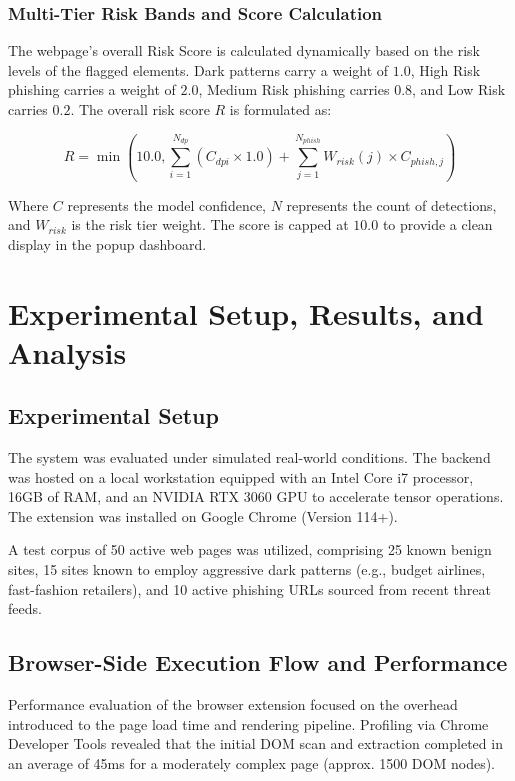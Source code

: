 \documentclass[12pt,a4paper]{report}
\begin{document}
\subsection{Multi-Tier Risk Bands and Score Calculation}
The webpage's overall Risk Score is calculated dynamically based on the risk levels of the flagged elements. Dark patterns carry a weight of $1.0$, High Risk phishing carries a weight of $2.0$, Medium Risk phishing carries $0.8$, and Low Risk carries $0.2$. The overall risk score $R$ is formulated as:

\begin{equation}
R = \min\left(10.0, \sum_{i=1}^{N_{dp}} (C_{dpi} \times 1.0) + \sum_{j=1}^{N_{phish}} W_{risk}(j) \times C_{phish,j} \right)
\end{equation}

Where $C$ represents the model confidence, $N$ represents the count of detections, and $W_{risk}$ is the risk tier weight. The score is capped at $10.0$ to provide a clean display in the popup dashboard.

\chapter{Experimental Setup, Results, and Analysis}

\section{Experimental Setup}
The system was evaluated under simulated real-world conditions. The backend was hosted on a local workstation equipped with an Intel Core i7 processor, 16GB of RAM, and an NVIDIA RTX 3060 GPU to accelerate tensor operations. The extension was installed on Google Chrome (Version 114+).

A test corpus of 50 active web pages was utilized, comprising 25 known benign sites, 15 sites known to employ aggressive dark patterns (e.g., budget airlines, fast-fashion retailers), and 10 active phishing URLs sourced from recent threat feeds.

\section{Browser-Side Execution Flow and Performance}
Performance evaluation of the browser extension focused on the overhead introduced to the page load time and rendering pipeline. Profiling via Chrome Developer Tools revealed that the initial DOM scan and extraction completed in an average of 45ms for a moderately complex page (approx. 1500 DOM nodes).
\end{document}

